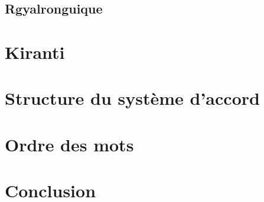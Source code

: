 \documentclass[oldfontcommands,oneside,a4paper,11pt]{article}
\begin{document}
\citealt{jacques12incorp}
\citealt{jacques14antipassive}
\citealt{jacques13harmonization}
\citealt{jacques15causative}
\citealt{lai13affixale}

\subsection{Rgyalronguique}

\section{Kiranti}
\citealt{jacques12khaling}
\citealt{jacques15derivational.khaling}
\section{Structure du système d'accord}

\citealt{jacques12agreement}

\section{Ordre des mots}

\section{Conclusion}
  


\end{document}
